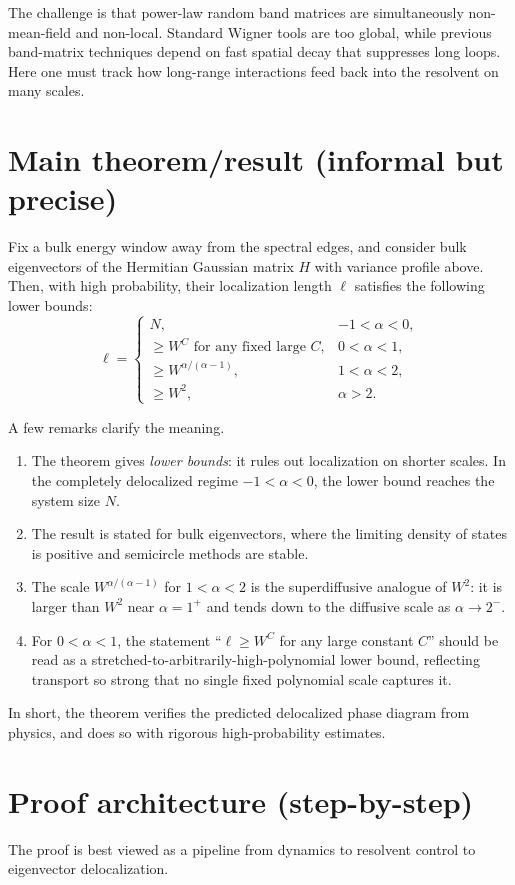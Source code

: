 \documentclass[11pt]{article}
\begin{document}
The challenge is that power-law random band matrices are simultaneously non-mean-field and non-local. Standard Wigner tools are too global, while previous band-matrix techniques depend on fast spatial decay that suppresses long loops. Here one must track how long-range interactions feed back into the resolvent on many scales.

\section*{Main theorem/result (informal but precise)}
Fix a bulk energy window away from the spectral edges, and consider bulk eigenvectors of the Hermitian Gaussian matrix $H$ with variance profile above. Then, with high probability, their localization length $\ell$ satisfies the following lower bounds:
\[
\ell=
\begin{cases}
N, & -1<\alpha<0,\\
\ge W^C \text{ for any fixed large } C, & 0<\alpha<1,\\
\ge W^{\alpha/(\alpha-1)}, & 1<\alpha<2,\\
\ge W^2, & \alpha>2.
\end{cases}
\]

A few remarks clarify the meaning.
\begin{enumerate}[leftmargin=1.5em]
    \item The theorem gives \emph{lower bounds}: it rules out localization on shorter scales. In the completely delocalized regime $-1<\alpha<0$, the lower bound reaches the system size $N$.
    \item The result is stated for bulk eigenvectors, where the limiting density of states is positive and semicircle methods are stable.
    \item The scale $W^{\alpha/(\alpha-1)}$ for $1<\alpha<2$ is the superdiffusive analogue of $W^2$: it is larger than $W^2$ near $\alpha=1^+$ and tends down to the diffusive scale as $\alpha\to 2^-$.
    \item For $0<\alpha<1$, the statement ``$\ell\ge W^C$ for any large constant $C$'' should be read as a stretched-to-arbitrarily-high-polynomial lower bound, reflecting transport so strong that no single fixed polynomial scale captures it.
\end{enumerate}

In short, the theorem verifies the predicted delocalized phase diagram from physics, and does so with rigorous high-probability estimates.

\section*{Proof architecture (step-by-step)}
The proof is best viewed as a pipeline from dynamics to resolvent control to eigenvector delocalization.
\end{document}
